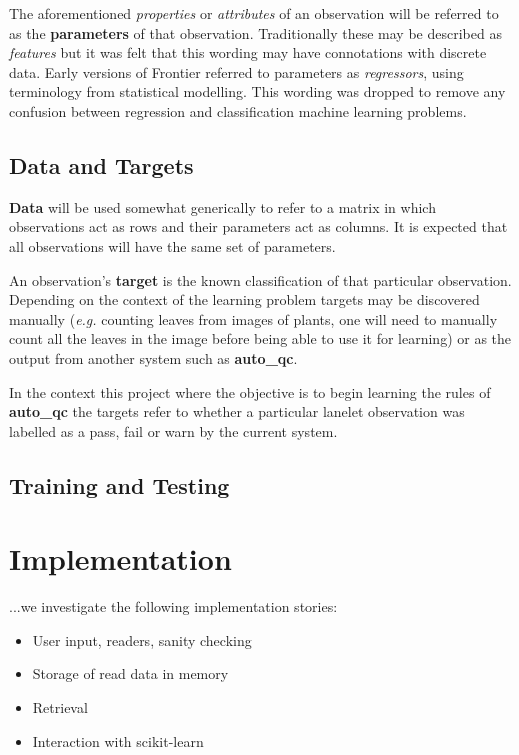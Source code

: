 The aforementioned \textit{properties} or \textit{attributes} of an observation
will be referred to as the \textbf{parameters} of that observation.
Traditionally these may be described as \textit{features} but it was felt that
this wording may have connotations with discrete data. Early versions of
Frontier referred to parameters as \textit{regressors}, using terminology from
statistical modelling. This wording was dropped to remove any confusion between
regression and classification machine learning problems.


\subsection{Data and Targets}

\textbf{Data} will be used somewhat generically to refer to a matrix in which
observations act as rows and their parameters act as columns. It is expected
that all observations will have the same set of parameters.

An observation's \textbf{target} is the known classification of that
particular observation.
Depending on the context of the learning problem targets may be discovered
manually (\textit{e.g.} counting leaves from images of plants, one will need to
manually count all the leaves in the image before being able to use it for
learning) or as the output from another system such as \textbf{auto\_qc}.

In the context this project where the objective is to begin learning the rules
of \textbf{auto\_qc} the targets refer to whether a particular lanelet
observation was labelled as a pass, fail or warn by the current system.


\subsection{Training and Testing}


\section{Implementation}
...we investigate the following implementation stories:

\begin{itemize}
    \item User input, readers, sanity checking
    \item Storage of read data in memory
    \item Retrieval
    \item Interaction with scikit-learn
\end{itemize}


